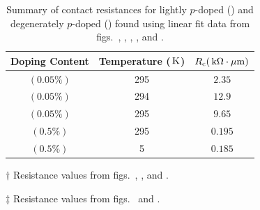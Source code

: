 \begin{table}[ht]
	\centering
	\begin{threeparttable}
		\begin{tabular}{c c c}
			\toprule
			Doping Content & Temperature ($\,\mathrm{K}$) & $R_\mathrm{c}(\,\mathrm{k\Omega\cdot\mu m})$ \\ [0.5ex]
			\midrule
			$(0.05\%)$ \lightlyfive & 295 & $2.35$\tnote{$\dagger$}\\
			$(0.05\%)$ \lightlyfive & 294 & $12.9$\tnote{$\dagger$}\\
			$(0.05\%)$ \lightlyfive & 295 & $9.65$\tnote{$\dagger$}\\ 
			$(0.5\%)$ \degenerate & 295 & $0.195$\tnote{$\ddagger$}\\ 
			$(0.5\%)$ \degenerate & 5 & $0.185$\tnote{$\ddagger$}\\[1ex]
			\bottomrule
		\end{tabular}
		\begin{tablenotes}
			\item[$\dagger$] Resistance values from figs.~, , and .
			\item[$\ddagger$] Resistance values from figs.~ and .
		\end{tablenotes}
	\caption[Summary of contact resistances for $0.05\%$  doped  channel]{Summary of contact resistances for lightly $p$-doped  (\lightlyfive) and degenerately $p$-doped  (\degenerate) found using linear fit data from figs.~, , , , and .}
	\label{table:contact_summary}
	\end{threeparttable}
\end{table}

